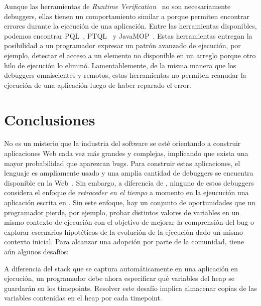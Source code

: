 \documentclass[conference]{IEEEtran}
\begin{document}
\smallskip

Aunque las herramientas de {\em Runtime Verification}~\cite{meredith:phd} no son necesariamente debuggers, ellas tienen un comportamiento similar a \deloreanjs porque permiten encontrar errores durante la ejecuci\'on de una aplicaci\'on. Entre las herramientas disponibles, podemos encontrar PQL~\cite{martinAl:oopsla2005}, PTQL~\cite{goldsmithAl:oopsla2005} y JavaMOP~\cite{meredithAl:jsttt2011,chen:oopsla2007}. Estas herramientas entregan la posibilidad a un programador expresar un patr\'on avanzado de ejecuci\'on, por ejemplo, detectar el acceso a un elemento no disponible en un arreglo porque otro hilo de ejecuci\'on lo elimin\'o. Lamentablemente, de la misma manera que los debuggers omniscientes y remotos, estas herramientas no permiten reanudar la ejecuci\'on de una aplicaci\'on luego de haber reparado el error.    

\section{Conclusiones}
\label{sec:conc}


No es un misterio que la industria del software se est\'e orientando a construir aplicaciones Web cada vez m\'as grandes y complejas, implicando que exista una mayor probabilidad que aparezcan bugs. Para construir estas aplicaciones, el lenguaje \javascript es ampliamente usado y una amplia cantidad de debuggers se encuentra disponible en la Web~\cite{bartonOdvarko:www2011,jsbin,nodejsInspector,sessionstack,raygun,trackjs,azar:2016,barrAl:fse2016}. Sin embargo, a diferencia de \deloreanjs, ninguno de estos debuggers considera el enfoque de {\em retroceder en el tiempo} a momento en la ejeucuci\'on una aplicaci\'on escrita en \javascript. Sin este enfoque, hay un conjunto de oportunidades que un programador pierde, por ejemplo, probar distintos valores de variables en un mismo contexto de ejecuci\'on con el objetivo de mejorar la comprensi\'on del bug o explorar escenarios hipot\'eticos de la evoluci\'on de la ejecuci\'on dado un mismo contexto inicial. Para alcanzar una adopci\'on por parte de la comunidad, \deloreanjs tiene a\'un algunos desaf\'ios:  
   
\smallskip

 A diferencia del stack que se captura autom\'aticamente en una aplicaci\'on en ejecuci\'on, un programador debe ahora especificar qu\'e variables del heap se guardar\'an en los timepoints. Resolver este desaf\'io implica almacenar copias de las variables contenidas en el heap por cada timepoint.      
\end{document}
